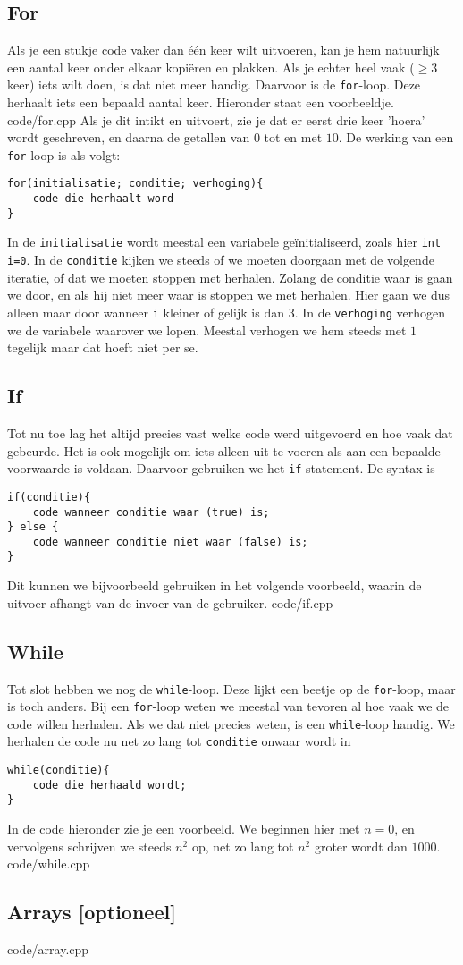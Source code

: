 \documentclass[12pt,a4paper]{article}
\newcommand{\code}{}
\newcommand{\icode}{\lstinline}
\begin{document}
\subsection{For}
Als je een stukje code vaker dan \'e\'en keer wilt uitvoeren, kan je hem natuurlijk een aantal keer onder elkaar kopi\"eren en plakken. Als je echter heel vaak ($\geq 3$ keer) iets wilt doen, is dat niet meer handig. Daarvoor is de \icode{for}-loop.
Deze herhaalt iets een bepaald aantal keer. Hieronder staat een voorbeeldje.
\code{code/for.cpp}
Als je dit intikt en uitvoert, zie je dat er eerst drie keer 'hoera' wordt geschreven, en daarna de getallen van $0$ tot en met $10$. De werking van een \icode{for}-loop is als volgt:\\
\begin{lstlisting}
for(initialisatie; conditie; verhoging){
	code die herhaalt word
}
\end{lstlisting}
In de \icode{initialisatie} wordt meestal een variabele ge\"initialiseerd, zoals hier \icode{int i=0}. In de \icode{conditie} kijken we steeds of we moeten doorgaan met de volgende iteratie, of dat we moeten stoppen met herhalen. Zolang de conditie waar is gaan we door, en als hij niet meer waar is stoppen we met herhalen. Hier gaan we dus alleen maar door wanneer \icode{i} kleiner of gelijk is dan $3$. In de \icode{verhoging} verhogen we de variabele waarover we lopen. Meestal verhogen we hem steeds met $1$ tegelijk maar dat hoeft niet per se.

\subsection{If}
Tot nu toe lag het altijd precies vast welke code werd uitgevoerd en hoe vaak dat gebeurde. Het is ook mogelijk om iets alleen uit te voeren als aan een bepaalde voorwaarde is voldaan. Daarvoor gebruiken we het \icode{if}-statement. De syntax is
\begin{lstlisting}
if(conditie){
	code wanneer conditie waar (true) is;
} else {
	code wanneer conditie niet waar (false) is;
}
\end{lstlisting}
Dit kunnen we bijvoorbeeld gebruiken in het volgende voorbeeld, waarin de uitvoer afhangt van de invoer van de gebruiker.
\code{code/if.cpp}
\subsection{While}
Tot slot hebben we nog de \icode{while}-loop. Deze lijkt een beetje op de \icode{for}-loop, maar is toch anders. Bij een \icode{for}-loop weten we meestal van tevoren al hoe vaak we de code willen herhalen. Als we dat niet precies weten, is een \icode{while}-loop handig. We herhalen de code nu net zo lang tot \icode{conditie} onwaar wordt in
\begin{lstlisting}
while(conditie){
	code die herhaald wordt;
}
\end{lstlisting}
In de code hieronder zie je een voorbeeld. We beginnen hier met $n=0$, en vervolgens schrijven we steeds $n^2$ op, net zo lang tot $n^2$ groter wordt dan $1000$.
\code{code/while.cpp}

\subsection{Arrays [optioneel]}
\code{code/array.cpp}
\end{document}
